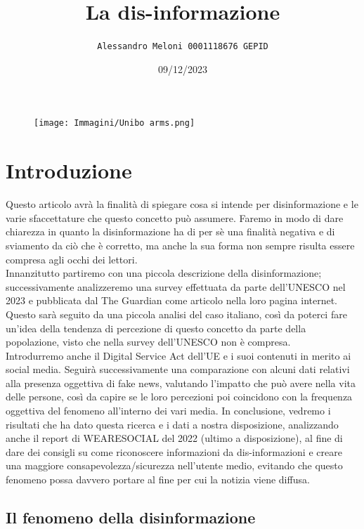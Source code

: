 \documentclass{article}
\title{\Huge\textbf{La dis-informazione}}
\author{\texttt{Alessandro Meloni 0001118676 GEPID}}
\date{09/12/2023}
\begin{document}
\begin{figure}
    \centering
    \texttt{[image: Immagini/Unibo arms.png]}
\end{figure}
    \maketitle
\centering\tableofcontents
\newpage \section{Introduzione}
\flushleft
\begin{justify}
    Questo articolo avrà la finalità di spiegare cosa si intende per disinformazione e le varie sfaccettature che questo concetto può assumere.
    Faremo in modo di dare chiarezza in quanto la disinformazione ha di per sè una finalità negativa e di sviamento da ciò che è corretto, ma anche la sua forma non sempre risulta essere compresa agli occhi dei lettori.\\
    Innanzitutto partiremo con una piccola descrizione della disinformazione; successivamente analizzeremo una survey effettuata da parte dell'UNESCO nel 2023 e pubblicata dal The Guardian come articolo nella loro pagina internet.\citep{TheGuardian}\\ Questo sarà seguito da una piccola analisi del caso italiano, così da poterci fare un'idea della tendenza di percezione di questo concetto da parte della popolazione, visto che nella survey dell'UNESCO non è compresa.\\
    Introdurremo anche il Digital Service Act dell'UE e i suoi contenuti in merito ai social media.
    Seguirà successivamente una comparazione con alcuni dati relativi alla presenza oggettiva di fake news, valutando l'impatto che può avere nella vita delle persone, così da capire se le loro percezioni poi coincidono con la frequenza oggettiva del fenomeno all'interno dei vari media.
    In conclusione, vedremo i risultati che ha dato questa ricerca e i dati a nostra disposizione, analizzando anche il report di WEARESOCIAL del 2022 (ultimo a disposizione), al fine di dare dei consigli su come riconoscere informazioni da dis-informazioni e creare una maggiore consapevolezza/sicurezza nell'utente medio, evitando che questo fenomeno possa davvero portare al fine per cui la notizia viene diffusa.
\end{justify}

\begin{center}
\section{Il fenomeno della disinformazione}
\end{center}
\end{document}

